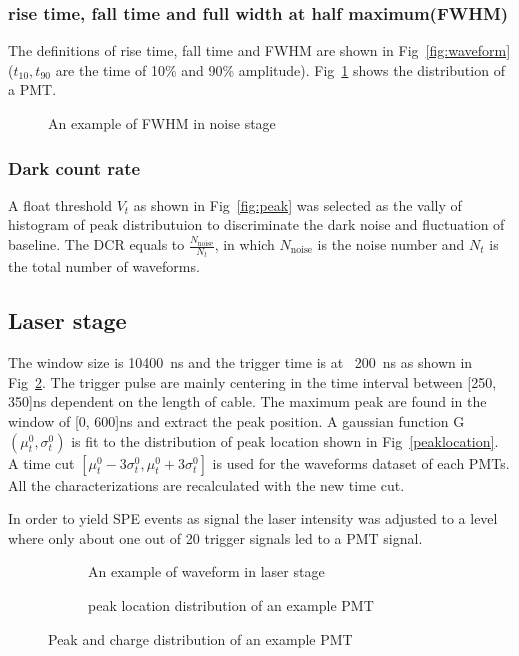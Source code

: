 \subsubsection{rise time, fall time and full width at half maximum(FWHM)}
The definitions of rise time, fall time and FWHM are shown in Fig~\ref{fig:waveform}($t_{10}, t_{90}$ are the time of 10\% and 90\% amplitude). Fig~\ref{fig:FWHM} shows the distribution of a PMT.
\begin{figure}
    \caption{An example of FWHM in noise stage}
    \label{fig:FWHM}
\end{figure}
\subsubsection{Dark count rate}
A float threshold $V_{t}$ as shown in Fig~\ref{fig:peak} was selected as the vally of histogram of peak distributuion to discriminate the dark noise and fluctuation of baseline. The DCR equals to $\frac{N_{\mathrm{noise}}}{N_{t}}$, in which $N_{\mathrm{noise}}$ is the noise number and $N_{t}$ is the total number of waveforms.

\subsection{Laser stage}
The window size is \SI{10400}{ns} and the trigger time is at ~\SI{200}{ns} as shown in Fig~\ref{fig:triggerwaveform}. The trigger pulse are mainly centering in the time interval between [250, 350]ns dependent on the length of cable. The maximum peak are found in the window of [0, 600]ns and extract the peak position. A gaussian function G$(\mu_t^0,\sigma_t^0)$ is fit to the distribution of peak location shown in Fig~\ref{peaklocation}. A time cut $[\mu_t^0-3\sigma_t^0, \mu_t^0+3\sigma_t^0]$ is used for the waveforms dataset of each PMTs. All the characterizations are recalculated with the new time cut.

In order to yield SPE events as signal the laser intensity was adjusted to a level where only
about one out of 20 trigger signals led to a PMT signal.

\begin{figure}
    \centering
    \begin{subfigure}[b]{0.35\textwidth}
        \caption{An example of waveform in laser stage}
        \label{fig:triggerwaveform}
    \end{subfigure}
    \begin{subfigure}[b]{0.35\textwidth}
        \caption{peak location distribution of an example PMT}%
        \label{fig:peaklocation}
    \end{subfigure}
    \caption{Peak and charge distribution of an example PMT}
\end{figure}
